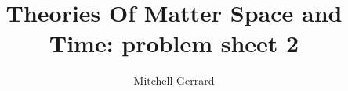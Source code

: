 \documentclass[12pt]{article}
\author{Mitchell Gerrard}
\affil{University of Southampton}
\title{Theories Of Matter Space and Time: problem sheet 2}
\begin{document}
\maketitle{}
\section{}
\end{document}
